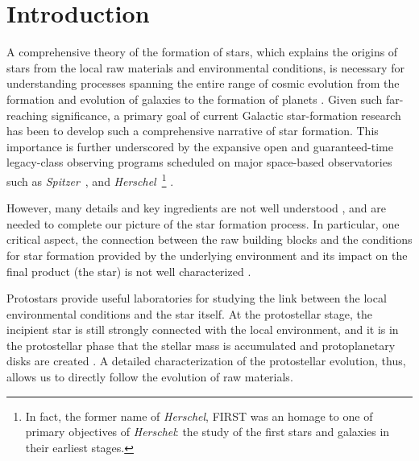 \documentclass[manuscript]{aastex61}
\newcommand{\herschel}{{\em Herschel}}
\newcommand{\spitzer}{{\em Spitzer}}
\begin{document}
\section{Introduction}
\par
A comprehensive theory of the formation of stars, which explains the origins of stars from the local raw materials and environmental conditions, is necessary for understanding processes spanning the entire range of cosmic evolution from the formation and evolution of galaxies to the formation of planets \citep{ke2012}.  Given such far-reaching significance, a primary goal of current Galactic star-formation research has been to develop such a comprehensive narrative of star formation.  This importance is further underscored by the expansive open and guaranteed-time legacy-class observing programs scheduled on major space-based observatories such as \spitzer\ \citep{spitzer}, and \herschel\ \footnote{In fact, the former name of \herschel, FIRST was an homage to one of primary objectives of \herschel: the study of the first stars and galaxies in their earliest stages.} \citep{herschel}.
\par
However, many details and key ingredients  are not well understood \citep{mo07}, and are needed to complete our picture of the star formation process.  In particular, one critical aspect, the connection between the raw building blocks and the conditions for star formation provided by the underlying environment and its impact on the final product (the star) is not well characterized \citep{dunham}.
\par
Protostars provide useful laboratories for studying the link between the local environmental conditions and the star itself.  At the protostellar stage, the incipient star is still strongly connected with the local environment, and it is in the protostellar phase that the stellar mass is accumulated and protoplanetary disks are created \citep{c2d09}.  A detailed characterization of the protostellar evolution, thus, allows us to directly follow the evolution of raw materials.
\par
\end{document}

